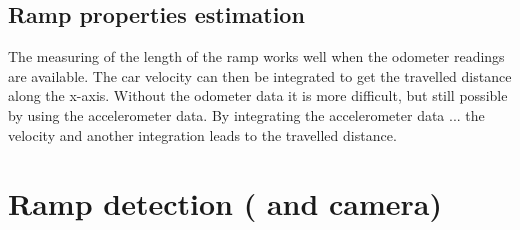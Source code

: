 \subsection{Ramp properties estimation}
The measuring of the length of the ramp works well when the odometer readings are available.
The car velocity can then be integrated to get the travelled distance along the x-axis.
Without the odometer data it is more difficult, but still possible by using the accelerometer data.
By integrating the accelerometer data ... the velocity and another integration leads to the travelled distance.




\section{Ramp detection ( and camera)}
